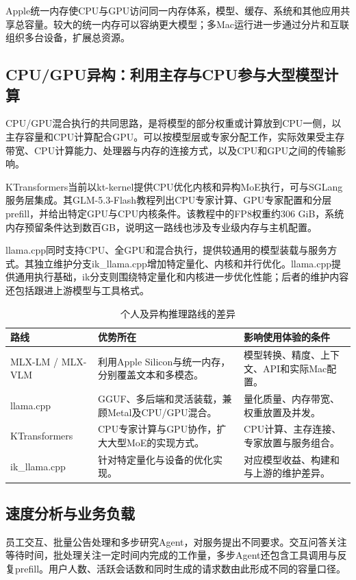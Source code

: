 Apple统一内存使CPU与GPU访问同一内存体系，模型、缓存、系统和其他应用共享总容量。较大的统一内存可以容纳更大模型；多Mac运行进一步通过分片和互联组织多台设备，扩展总资源。

\subsection{CPU/GPU异构：利用主存与CPU参与大型模型计算}
CPU/GPU混合执行的共同思路，是将模型的部分权重或计算放到CPU一侧，以主存容量和CPU计算配合GPU。可以按模型层或专家分配工作，实际效果受主存带宽、CPU计算能力、处理器与内存的连接方式，以及CPU和GPU之间的传输影响。

KTransformers当前以kt-kernel提供CPU优化内核和异构MoE执行，可与SGLang服务层集成。其GLM-5.3-Flash教程列出CPU专家计算、GPU专家配置和分层prefill，并给出特定GPU与CPU内核条件。该教程中的FP8权重约306 GiB，系统内存预留条件达到数百GB，说明这一路线也涉及专业级内存与主机配置。

llama.cpp同时支持CPU、全GPU和混合执行，提供较通用的模型装载与服务方式。其独立维护分支ik\_llama.cpp增加特定量化、内核和并行优化。llama.cpp提供通用执行基础，ik分支则围绕特定量化和内核进一步优化性能；后者的维护内容还包括跟进上游模型与工具格式。

\begin{table}[H]\small\centering
\caption{个人及异构推理路线的差异}
\begin{tabularx}{\linewidth}{@{}P{29mm}Y Y@{}}\toprule
路线 & 优势所在 & 影响使用体验的条件\\\midrule
MLX-LM / MLX-VLM & 利用Apple Silicon与统一内存，分别覆盖文本和多模态。 & 模型转换、精度、上下文、API和实际Mac配置。\\
llama.cpp & GGUF、多后端和灵活装载，兼顾Metal及CPU/GPU混合。 & 量化质量、内存带宽、权重放置及并发。\\
KTransformers & CPU专家计算与GPU协作，扩大大型MoE的实现方式。 & CPU计算、主存连接、专家放置与服务组合。\\
ik\_llama.cpp & 针对特定量化与设备的优化实现。 & 对应模型收益、构建和与上游的维护差异。\\\bottomrule
\end{tabularx}
\end{table}

\subsection{速度分析与业务负载}
员工交互、批量公告处理和多步研究Agent，对服务提出不同要求。交互问答关注等待时间，批处理关注一定时间内完成的工作量，多步Agent还包含工具调用与反复prefill。用户人数、活跃会话数和同时生成的请求数由此形成不同的容量口径。

